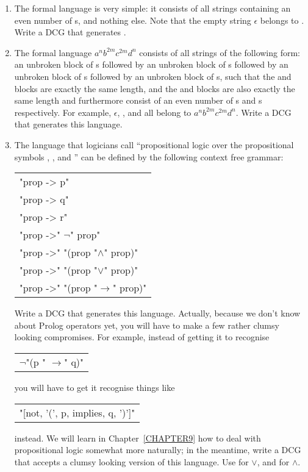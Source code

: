 \begin{enumerate}
\item{}The formal language  is very simple: it consists of
all strings containing an even number of s, and nothing else.
Note that the empty string $\epsilon$ belongs to .
Write a DCG that generates .
\item{}The formal language $a^nb^{2m}c^{2m}d^{n}$ consists of all
strings of the following form: an unbroken block of s followed
by an unbroken block of s followed by an unbroken block of
s followed by an unbroken block of s, such that the 
and  blocks are exactly the same length, and the  and
 blocks are also exactly the same length and furthermore consist of
an even number of s and s respectively. For example, $\epsilon$,
, and  all belong to
$a^nb^{2m}c^{2m}d^{n}$.  Write a DCG that generates this
language.
\item{}The language that logicians call ``propositional logic
over the propositional symbols ,
, and '' can be defined
by the following context free grammar:
\begin{center}\begin{tabular}{l}
"prop -> p"\\
"prop -> q"\\
"prop -> r"\\
"prop ->" $\neg$" prop"\\
"prop ->" "(prop "$\wedge$" prop)"\\
"prop ->" "(prop "$\vee$" prop)"\\
"prop ->" "(prop "$\rightarrow$" prop)"
\end{tabular}\end{center}

Write a DCG that generates this language. Actually, because we don't
know about Prolog operators yet, you will have to make a few rather
clumsy looking compromises. For example, instead of getting it to
recognise
\begin{center}\begin{tabular}{l}$\neg$"(p " $\rightarrow$" q)"
\end{tabular}\end{center}
you will have to get it recognise things like
\begin{center}\begin{tabular}{l}"[not, '(', p, implies, q, ')']"
\end{tabular}\end{center}
instead. We will learn in Chapter~\ref{CHAPTER9} how to deal with
propositional logic somewhat more naturally; in the meantime, write a
DCG that accepts a clumsy looking version of this language. Use
 for $\vee$, and  for $\wedge$.
\end{enumerate}
